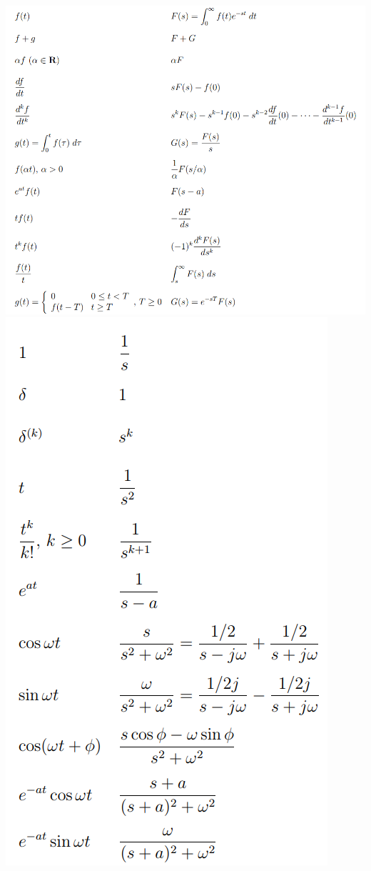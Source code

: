 \documentclass{article}
\theoremstyle{definition}
\begin{document}
\begin{multicols}{3}
\includegraphics[width=1\linewidth]{general_laplace}
\includegraphics[width=0.7\linewidth]{specific_laplace}


\end{multicols}
\end{document}

